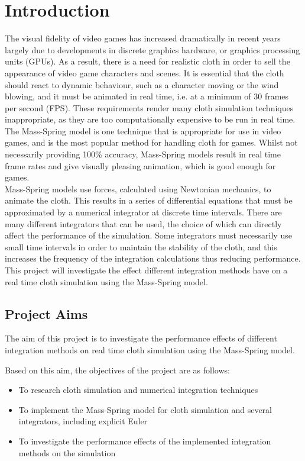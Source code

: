 \chapter{Introduction}

The visual fidelity of video games has increased dramatically in recent years largely due to developments in discrete graphics hardware, or graphics processing units (GPUs). As a result, there is a need for realistic cloth in order to sell the appearance of video game characters and scenes. It is essential that the cloth should react to dynamic behaviour, such as a character moving or the wind blowing, and it must be animated in real time, i.e. at a minimum of 30 frames per second (FPS). These requirements render many cloth simulation techniques inappropriate, as they are too computationally expensive to be run in real time. The Mass-Spring model is one technique that is appropriate for use in video games, and is the most popular method for handling cloth for games. Whilst not necessarily providing 100\% accuracy, Mass-Spring models result in real time frame rates and give visually pleasing animation, which is good enough for games.
\\Mass-Spring models use forces, calculated using Newtonian mechanics, to animate the cloth. This results in a series of differential equations that must be approximated by a numerical integrator at discrete time intervals. There are many different integrators that can be used, the choice of which can directly affect the performance of the simulation. Some integrators must necessarily use small time intervals in order to maintain the stability of the cloth, and this increases the frequency of the integration calculations thus reducing performance.
\\This project will investigate the effect different integration methods have on a real time cloth simulation using the Mass-Spring model.

\section{Project Aims}
The aim of this project is to investigate the performance effects of different integration methods on real time cloth simulation using the Mass-Spring model.

Based on this aim, the objectives of the project are as follows:
\begin{itemize}
\item {To research cloth simulation and numerical integration techniques }
\item {To implement the Mass-Spring model for cloth simulation and several integrators, including explicit Euler}
\item {To investigate the performance effects of the implemented integration methods on the simulation}
\end{itemize}

